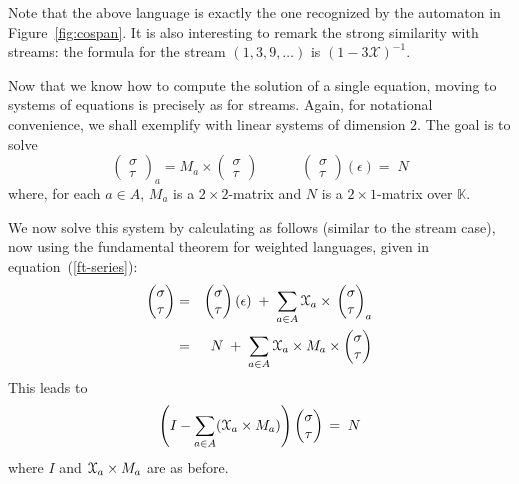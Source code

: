 \documentclass[3p]{elsarticle}
\newcommand{\X}{\mathcal{X}}           %
\newcommand{\streamproduct}{\times} %
\newcommand{\K}{\mathbb{K}}            %
\begin{document}
Note that the above language is exactly the one recognized by the
automaton in Figure~\ref{fig:cospan}. It is also interesting to
remark the strong similarity with streams: the formula for the
stream $(1,3,9,\ldots)$ is $(1-3\X)^{-1}$.

\bigskip

Now that we know how to compute the solution of a single equation,
moving to systems of equations is precisely as for streams. Again,
for notational convenience, we shall exemplify with linear systems
of dimension $2$. The goal is to solve
\[
\begin{pmatrix}%
\sigma \\ \tau
\end{pmatrix}_a
=  M_a \streamproduct
\begin{pmatrix}%
\sigma \\ \tau
\end{pmatrix}
\;\;\;\;\;\;\;\;\;\;\;
\begin{pmatrix}%
\sigma \\ \tau
\end{pmatrix} (\epsilon)
= \;
N
\]
where, for each $a\in A$, $M_a$ is a $2\times 2$-matrix and $N$ is
a $2\times 1$-matrix over $\K$.

We now solve this system by calculating as follows (similar to the
stream case), now using the fundamental theorem for weighted
languages, given in equation~(\ref{ft-series}):
\begin{eqnarray*}
\begin{pmatrix}%
\sigma \\ \tau
\end{pmatrix}
& = &
\begin{pmatrix}%
\sigma \\ \tau
\end{pmatrix} (\epsilon)
\; + \; \sum_{a\in A} \Xa \streamproduct \,
\begin{pmatrix}%
\sigma \\ \tau
\end{pmatrix}_a
\\
& = & N \; + \; \sum_{a\in A}  \Xa \streamproduct M_a
\streamproduct
\begin{pmatrix}%
\sigma \\ \tau
\end{pmatrix}
\end{eqnarray*}
This leads to
\[
\left(I - \sum_{a\in A} (\Xa \streamproduct M_a)\right)
\begin{pmatrix}%
\sigma \\ \tau
\end{pmatrix}
\, = \; N
\]
where $I$  and $\Xa \streamproduct M_a$ are as before.
\end{document}
